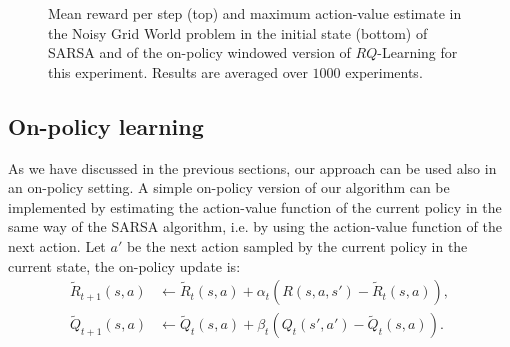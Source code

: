 \begin{figure}[t]
\begin{minipage}{\columnwidth}
\end{minipage}
  \caption[Grid World with Holes algorithms comparison - 2]{Mean reward per step (top) and maximum action-value estimate in the Noisy Grid World problem in the initial state (bottom) of SARSA and of the on-policy windowed version of $RQ$-Learning for this experiment. Results are averaged over $1000$ experiments.}
  \label{F:sarsa}
\end{figure}

\subsection{On-policy learning}
As we have discussed in the previous sections, our approach can be used also in an on-policy setting. A simple on-policy version of our algorithm can be implemented by estimating the action-value function of the current policy in the same way of the SARSA algorithm, i.e. by using the action-value function of the next action. Let $a'$ be the next action sampled by the current policy in the current state, the on-policy update is:
\begin{align*}
\tilde{R}_{t+1}(s,a) & \leftarrow\tilde{R}_t(s,a)+\alpha_t(R(s,a,s')-\tilde{R}_t(s,a)),\\
\tilde{Q}_{t+1}(s,a) & \leftarrow\tilde{Q}_t(s,a)+\beta_t(Q_t(s',a')-\tilde{Q}_t(s,a)).
\end{align*}

